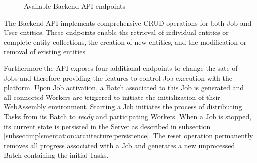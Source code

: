 \begin{figure}[bth]
    \myfloatalign
     \quad \quad
    \caption{Available Backend \ac{API} endpoints}
    \label{fig:implementation:backend}
\end{figure}

The Backend \ac{API} implements comprehensive \ac{CRUD} operations for both Job and User entities. These endpoints enable the retrieval of individual entities or complete entity collections, the creation of new entities, and the modification or removal of existing entities.

Furthermore the \ac{API} exposes four additional endpoints to change the sate of Jobs and therefore providing the features to control Job execution with the platform. Upon Job activation, a Batch associated to this Job is generated and all connected Workers are triggered to initiate the initialization of their WebAssembly environment. Starting a Job initiates the process of distributing Tasks from its Batch to \emph{ready} and participating Workers. When a Job is stopped, its current state is persisted in the Server as described in subsection \ref{subsec:implementation:architecture:persistence}. The reset operation permanently removes all progress associated with a Job and generates a new unprocessed Batch containing the initial Tasks.

